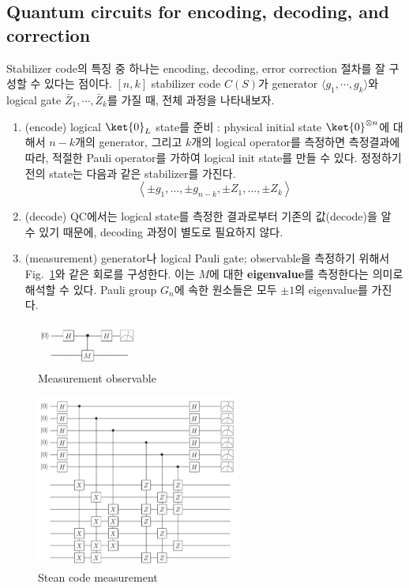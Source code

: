 \subsection{Quantum circuits for encoding, decoding, and correction}
Stabilizer code의 특징 중 하나는 encoding, decoding, error correction 절차를 잘 구성할 수 있다는 점이다. $[n, k]$ stabilizer code $C(S)$가 generator $\langle g_1, \cdots, g_k\rangle$와 logical gate $\bar Z_1, \cdots, \bar Z_k$를 가질 때, 전체 과정을 나타내보자.
\begin{enumerate}
    \item (encode) logical $\ket{0}_L$ state를 준비 : physical initial state $\ket{0}^{\otimes n}$에 대해서 $n-k$개의 generator, 그리고 $k$개의 logical operator를 측정하면 측정결과에 따라, 적절한 Pauli operator를 가하여 logical init state를 만들 수 있다. 정정하기전의 state는 다음과 같은 stabilizer를 가진다.
    \begin{equation*}
        \left\langle \pm g_1, \ldots, \pm g_{n-k}, \pm Z_1, \ldots, \pm Z_k\right\rangle
    \end{equation*}
    \item (decode) QC에서는 logical state를 측정한 결과로부터 기존의 값(decode)을 알 수 있기 때문에, decoding 과정이 별도로 필요하지 않다. 
    \item (measurement) generator나 logical Pauli gate; observable을 측정하기 위해서 Fig.~\ref{fig:measurement}와 같은 회로를 구성한다. 이는 $M$에 대한 \textbf{eigenvalue}를 측정한다는 의미로 해석할 수 있다. Pauli group $G_n$에 속한 원소들은 모두 $\pm 1$의 eigenvalue를 가진다.
\end{enumerate}
\begin{figure}[h]
    \centering
    \includegraphics[width=0.3\textwidth]{figures/C7_measurement.png}
    \caption{Measurement observable}
    \label{fig:measurement}
\end{figure}
\begin{figure}[h]
    \centering
    \includegraphics[width=0.6\textwidth]{figures/C7_stean_code_measurement.png}
    \caption{Stean code measurement}
\end{figure}

